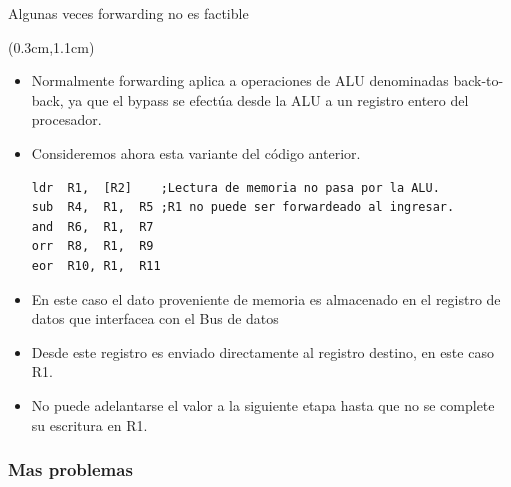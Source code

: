 \documentclass[table,dvipsnames,aspectratio=169]{beamer}
\begin{document}
\begin{frame}[fragile]{Algunas veces forwarding no es factible}
 \begin{textblock*}{\textwidth}(0.3cm,1.1cm)
  \begin{itemize}[<+(1)->] \justifying
   \item Normalmente forwarding aplica a operaciones de ALU denominadas back-to-back, ya que el bypass se efectúa desde la ALU a un registro entero del procesador.
   \item Consideremos ahora esta variante del código anterior.
\lstset{numbers=none,}
\vspace{-.3cm}
\begin{lstlisting}[escapechar=\|,label=noint]
ldr  R1,  [R2]    ;Lectura de memoria no pasa por la ALU.
sub  R4,  R1,  R5 ;R1 no puede ser forwardeado al ingresar.
and  R6,  R1,  R7
orr  R8,  R1,  R9
eor  R10, R1,  R11
\end{lstlisting}
\vspace{-.3cm}
   \item En este caso el dato proveniente de memoria es almacenado en el registro de datos que interfacea con el Bus de datos
   \item Desde este registro es enviado directamente al registro destino, en este caso R1.
   \item No puede adelantarse el valor a la siguiente etapa hasta que no se complete su escritura en R1.
  \end{itemize}
 \end{textblock*}
\end{frame}
 
\subsubsection{Mas problemas}
 
\end{document}
